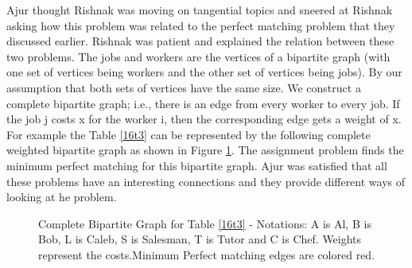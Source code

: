 Ajur thought Rishnak was moving on tangential topics and sneered at Rishnak asking how this problem was related to the perfect matching problem that they discussed earlier. Rishnak was patient and explained the relation between these two problems.
The jobs and workers are the vertices of a bipartite graph (with one set of vertices being workers and the other set of vertices being jobs). By our assumption that both sets of vertices have the same size. We
construct a complete bipartite graph; i.e., there is an edge from every worker to every job. If the job j costs x for the worker i, then the corresponding edge gets a weight of x. For example the Table \ref{16t3} can be represented by the following complete weighted bipartite graph as shown in Figure \ref{16g3}. The assignment problem finds the minimum perfect matching for this bipartite graph. Ajur was satisfied that all these problems have an interesting connections and they provide different ways of looking at he problem.
\begin{figure}
\begin{center}

\caption{Complete Bipartite Graph for Table \ref{16t3} - Notations: A is Al, B is Bob, L is Caleb, S is Salesman, T is Tutor and C is Chef. Weights represent the costs.Minimum Perfect matching edges are colored red.}\label{16g3}
\end{center}
\end{figure}

\begin{newpage}
\end{newpage}

